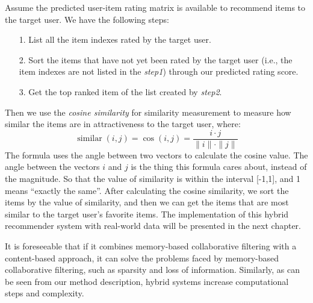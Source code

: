 Assume the predicted user-item rating matrix is available to recommend items to the target user. We have the following steps:
\begin{itemize}
    \item[1. ]  List all the item indexes rated by the target user.
    \item[2. ] Sort the items that have not yet been rated by the target user (i.e., the item indexes are not listed in the \textit{step1}) through our predicted rating score.
    \item[3. ] Get the top ranked item of the list created by \textit{step2}.
\end{itemize}
Then we use the \textit{cosine similarity} for similarity measurement to measure how similar the items are in attractiveness to the target user, where:
\begin{equation}
\operatorname{similar}(i, j)=\cos (i, j)=\frac{i \cdot j}{\|i\| \cdot\|j\|}
\end{equation}
The formula uses the angle between two vectors to calculate the cosine value. The angle between the vectors $i$ and $j$ is the thing this formula cares about, instead of the magnitude. So that the value of similarity is within the interval [-1,1], and 1 means “exactly the same”. After calculating the cosine similarity, we sort the items by the value of similarity, and then we can get the items that are most similar to the target user's favorite items. The implementation of this hybrid recommender system with real-world data will be presented in the next chapter.

It is foreseeable that if it combines memory-based collaborative filtering with a content-based approach, it can solve the problems faced by memory-based collaborative filtering, such as sparsity and loss of information. Similarly, as can be seen from our method description, hybrid systems increase computational steps and complexity.